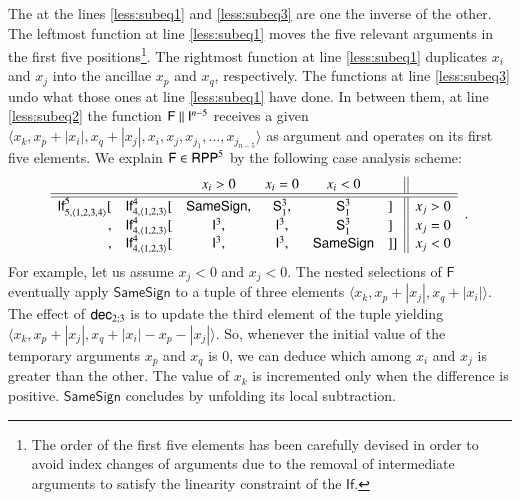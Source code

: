 \noindent
The \rprSComName at the lines \eqref{less:subeq1} and \eqref{less:subeq3} are one the inverse of the other.
The leftmost function at line \eqref{less:subeq1} moves the five relevant 
arguments in the first five positions\footnote{
The order of the first five elements has been carefully devised in order to avoid index changes of 
arguments due to the removal of intermediate arguments to satisfy the  linearity constraint of 
the $\mathsf{If}$.}.
The rightmost function at line \eqref{less:subeq1} duplicates $x_i$ and $x_j$ into the ancillae
$x_p$ and $x_q$, respectively. The functions at line \eqref{less:subeq3} undo what 
those ones at line \eqref{less:subeq1} have done. In between them,
at line \eqref{less:subeq2} 
the function $ \mathsf{F} \  \rVert \ \mathsf{I}^{n-5} $ receives a given 
$\langle x_k,x_p+|x_i|,x_q+|x_j|,x_i,x_j,x_{j_1},\ldots,x_{j_{n-5}}\rangle$ 
as argument and operates on its first five elements.
We explain $ \mathsf{F}\in\mathsf{RPP}^5$ by the following case analysis scheme:
\begin{align*}
\begin{array}{rrcccl||l}
                 &                 & x_i > 0         & x_i = 0     & x_i < 0       &       \\
                 \hline\hline  %
\mathsf{If}^{5\phantom{|}}_{5,\langle1,2,3,4\rangle} 
      [&\mathsf{If}^{4}_{4,\langle1,2,3\rangle} [&\mathsf{SameSign},&  \rprSucc^3_1,   &   \rprSucc^3_1    &] & x_j > 0 \\
      ,&\mathsf{If}^{4}_{4,\langle1,2,3\rangle} [& \rprId^3,    &  \rprId^3,    &  \rprSucc^3_1   &] & x_j = 0 \\
      ,&\mathsf{If}^{4}_{4,\langle1,2,3\rangle} [&   \rprId^3,  &  \rprId^3,     &\mathsf{SameSign}&]]& x_j < 0 
\end{array}
\enspace .
\end{align*}
For example, 
let us assume $x_j <0$ and $x_j < 0$. The nested selections of $ \mathsf{F} $ eventually apply
$ \mathsf{SameSign} $ to a tuple of three elements $ \langle x_k, x_p+|x_j|, x_q+|x_i|\rangle $.
The effect of  $\mathsf{dec}_{2;3} $ is to update the third element of the 
tuple yielding $ \langle x_k, x_p+|x_j|, x_q+|x_i|-x_p-|x_j|\rangle $. So, whenever the initial
value of the temporary arguments $ x_p $ and $ x_q $ is $0$, we can deduce which among
$ x_i $ and $ x_j $ is greater than the other. The value of $ x_k $ is incremented only when
the difference is positive. $ \mathsf{SameSign} $ concludes by unfolding its local subtraction.


